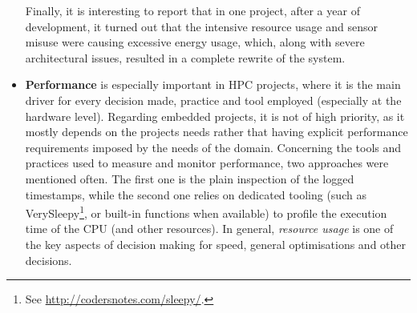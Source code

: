 \begin{itemize}
    Finally, it is interesting to report that in one project, after a year of development, it turned out that the intensive resource usage and sensor misuse were causing excessive energy usage, which, along with severe architectural issues, resulted in a complete rewrite of the system.

    
    \item \textbf{Performance} is especially important in HPC projects, where it is the main driver for every decision made, practice and tool employed (especially at the hardware level).
    Regarding embedded projects, it is not of high priority, as it mostly depends on the projects needs rather that having explicit performance requirements imposed by the needs of the domain.
    Concerning the tools and practices used to measure and monitor performance, two approaches were mentioned often.
    The first one is the plain inspection of the logged timestamps, while the second one relies on dedicated tooling (such as VerySleepy\footnote{See \url{http://codersnotes.com/sleepy/}.}, or built-in functions when available) to profile the execution time of the CPU (and other resources).
    In general, \textit{resource usage} is one of the key aspects of decision making for speed, general optimisations and other decisions.
\end{itemize}

